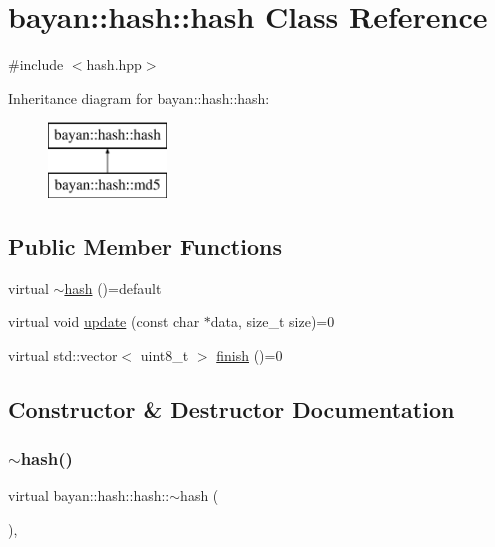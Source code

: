 \hypertarget{classbayan_1_1hash_1_1hash}{}\section{bayan\+:\+:hash\+:\+:hash Class Reference}
\label{classbayan_1_1hash_1_1hash}


{\ttfamily \#include $<$hash.\+hpp$>$}

Inheritance diagram for bayan\+:\+:hash\+:\+:hash\+:\begin{figure}[H]
\begin{center}
\leavevmode
\includegraphics[height=2.000000cm]{classbayan_1_1hash_1_1hash}
\end{center}
\end{figure}
\subsection*{Public Member Functions}
\begin{DoxyCompactItemize}
\item 
virtual \hyperlink{classbayan_1_1hash_1_1hash_a115b320d7c70ffdd24e8df2fa2a1e892}{$\sim$hash} ()=default
\item 
virtual void \hyperlink{classbayan_1_1hash_1_1hash_abc43a44f53acc0278f46a96438dc4cf3}{update} (const char $\ast$data, size\+\_\+t size)=0
\item 
virtual std\+::vector$<$ uint8\+\_\+t $>$ \hyperlink{classbayan_1_1hash_1_1hash_a0532214ff924522ba61fbe9a6ade4705}{finish} ()=0
\end{DoxyCompactItemize}


\subsection{Constructor \& Destructor Documentation}
\mbox{\label{classbayan_1_1hash_1_1hash_a115b320d7c70ffdd24e8df2fa2a1e892}} 
\subsubsection{\texorpdfstring{$\sim$hash()}{~hash()}}
{\footnotesize\ttfamily virtual bayan\+::hash\+::hash\+::$\sim$hash (\begin{DoxyParamCaption}{ }\end{DoxyParamCaption})\hspace{0.3cm}{\ttfamily [virtual]}, {\ttfamily [default]}}



